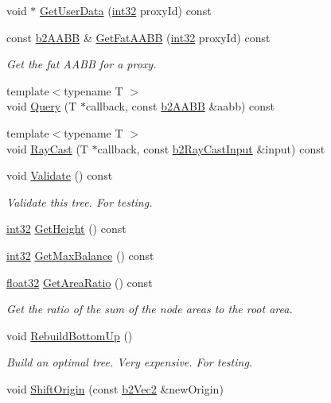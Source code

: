 \begin{DoxyCompactItemize}
\item 
void $\ast$ \mbox{\hyperlink{classb2_dynamic_tree_aa8399f9440707780f267696098e8b920}{Get\+User\+Data}} (\mbox{\hyperlink{b2_settings_8h_a43d43196463bde49cb067f5c20ab8481}{int32}} proxy\+Id) const
\item 
const \mbox{\hyperlink{structb2_a_a_b_b}{b2\+A\+A\+BB}} \& \mbox{\hyperlink{classb2_dynamic_tree_a655b9ddff43e4e0a34a372eddc03ecb9}{Get\+Fat\+A\+A\+BB}} (\mbox{\hyperlink{b2_settings_8h_a43d43196463bde49cb067f5c20ab8481}{int32}} proxy\+Id) const
\begin{DoxyCompactList}\small\item\em Get the fat A\+A\+BB for a proxy. \end{DoxyCompactList}\item 
{\footnotesize template$<$typename T $>$ }\\void \mbox{\hyperlink{classb2_dynamic_tree_a324df3eb65dfc22d3dcdca387737b193}{Query}} (T $\ast$callback, const \mbox{\hyperlink{structb2_a_a_b_b}{b2\+A\+A\+BB}} \&aabb) const
\item 
{\footnotesize template$<$typename T $>$ }\\void \mbox{\hyperlink{classb2_dynamic_tree_aebd2dc6ee462e0cd0763a5f472243a13}{Ray\+Cast}} (T $\ast$callback, const \mbox{\hyperlink{structb2_ray_cast_input}{b2\+Ray\+Cast\+Input}} \&input) const
\item 
void \mbox{\hyperlink{classb2_dynamic_tree_ae9b989f0c04e38f9c940623d4e1728b9}{Validate}} () const
\begin{DoxyCompactList}\small\item\em Validate this tree. For testing. \end{DoxyCompactList}\item 
\mbox{\hyperlink{b2_settings_8h_a43d43196463bde49cb067f5c20ab8481}{int32}} \mbox{\hyperlink{classb2_dynamic_tree_ae3c7dc771d596f1f95fd3a3d7f2f3e97}{Get\+Height}} () const
\item 
\mbox{\hyperlink{b2_settings_8h_a43d43196463bde49cb067f5c20ab8481}{int32}} \mbox{\hyperlink{classb2_dynamic_tree_a3feab170229e0acd17f6a4ad3fca406e}{Get\+Max\+Balance}} () const
\item 
\mbox{\hyperlink{b2_settings_8h_aacdc525d6f7bddb3ae95d5c311bd06a1}{float32}} \mbox{\hyperlink{classb2_dynamic_tree_a87da9819c4f190faec38f7fe4608caae}{Get\+Area\+Ratio}} () const
\begin{DoxyCompactList}\small\item\em Get the ratio of the sum of the node areas to the root area. \end{DoxyCompactList}\item 
void \mbox{\hyperlink{classb2_dynamic_tree_abd146017cfec1cf5ea7b87331f30a3ff}{Rebuild\+Bottom\+Up}} ()
\begin{DoxyCompactList}\small\item\em Build an optimal tree. Very expensive. For testing. \end{DoxyCompactList}\item 
void \mbox{\hyperlink{classb2_dynamic_tree_af37ddfed6a5da97d5a78b09918d19ceb}{Shift\+Origin}} (const \mbox{\hyperlink{structb2_vec2}{b2\+Vec2}} \&new\+Origin)
\end{DoxyCompactItemize}


